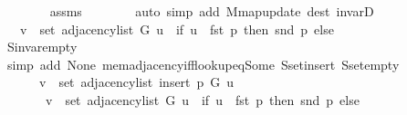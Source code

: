 \begin{isabellebody}
\ \ \ \ \ \ \isamarkupfalse%
\ assms\isanewline
\ \ \ \ \ \ \isamarkupfalse%
\ {\isacharparenleft}{\kern0pt}auto\ simp\ add{\isacharcolon}{\kern0pt}\ M{\isachardot}{\kern0pt}map{\isacharunderscore}{\kern0pt}update\ dest{\isacharcolon}{\kern0pt}\ invarD{\isacharparenleft}{\kern0pt}{}{\isacharparenright}{\kern0pt}{\isacharparenright}{\kern0pt}\isanewline
\ \ \ \ \isamarkupfalse%
\ \isamarkupfalse%
\ {\isachardoublequoteopen}{\isachardot}{\kern0pt}{\isachardot}{\kern0pt}{\isachardot}{\kern0pt}\ {\isasymlongleftrightarrow}\ v\ {\isasymin}\ set\ {\isacharparenleft}{\kern0pt}adjacency{\isacharunderscore}{\kern0pt}list\ G\ u{\isacharparenright}{\kern0pt}\ {\isasymunion}\ {\isacharparenleft}{\kern0pt}if\ u\ {\isacharequal}{\kern0pt}\ fst\ p\ then\ {\isacharbraceleft}{\kern0pt}snd\ p{\isacharbraceright}{\kern0pt}\ else\ {\isacharbraceleft}{\kern0pt}{\isacharbraceright}{\kern0pt}{\isacharparenright}{\kern0pt}{\isachardoublequoteclose}\isanewline
\ \ \ \ \ \ \isamarkupfalse%
\ S{\isachardot}{\kern0pt}invar{\isacharunderscore}{\kern0pt}empty\isanewline
\ \ \ \ \ \ \isamarkupfalse%
\ {\isacharparenleft}{\kern0pt}simp\ add{\isacharcolon}{\kern0pt}\ None\ mem{\isacharunderscore}{\kern0pt}adjacency{\isacharunderscore}{\kern0pt}iff{\isacharunderscore}{\kern0pt}lookup{\isacharunderscore}{\kern0pt}eq{\isacharunderscore}{\kern0pt}Some\ S{\isachardot}{\kern0pt}set{\isacharunderscore}{\kern0pt}insert\ S{\isachardot}{\kern0pt}set{\isacharunderscore}{\kern0pt}empty{\isacharparenright}{\kern0pt}\isanewline
\ \ \ \ \isamarkupfalse%
\ \isamarkupfalse%
\isanewline
\ \ \ \ \ \ {\isachardoublequoteopen}v\ {\isasymin}\ set\ {\isacharparenleft}{\kern0pt}adjacency{\isacharunderscore}{\kern0pt}list\ {\isacharparenleft}{\kern0pt}insert\ p\ G{\isacharparenright}{\kern0pt}\ u{\isacharparenright}{\kern0pt}\ {\isasymlongleftrightarrow}\isanewline
\ \ \ \ \ \ \ v\ {\isasymin}\ set\ {\isacharparenleft}{\kern0pt}adjacency{\isacharunderscore}{\kern0pt}list\ G\ u{\isacharparenright}{\kern0pt}\ {\isasymunion}\ {\isacharparenleft}{\kern0pt}if\ u\ {\isacharequal}{\kern0pt}\ fst\ p\ then\ {\isacharbraceleft}{\kern0pt}snd\ p{\isacharbraceright}{\kern0pt}\ else\ {\isacharbraceleft}{\kern0pt}{\isacharbraceright}{\kern0pt}{\isacharparenright}{\kern0pt}{\isachardoublequoteclose}\isanewline
\ \ \ \ \ \ \isacommand{{\isachardot}{\kern0pt}}\isamarkupfalse%
\ \isacommand{{\isacharbraceright}{\kern0pt}}\isamarkupfalse%
\isanewline
\ \ \isamarkupfalse%

\end{isabellebody}
